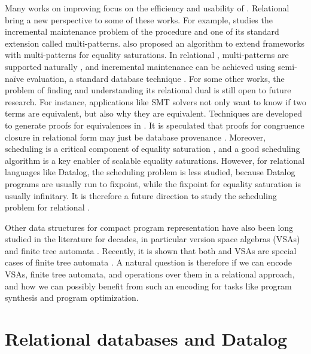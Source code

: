 Many works on improving \egraphs focus on the efficiency and usability of \egraphs.
Relational \egraphs bring a new perspective to some of these works.
For example, \citep{efficient-ematching} studies 
 the incremental maintenance problem of the \ematching procedure
 and one of its standard extension called multi-patterns.
\citet{tensat} also proposed an algorithm 
 to extend \egraph frameworks with multi-patterns for equality saturations.
In relational \egraphs, multi-patterns are supported naturally \citep{relational-ematching},
 and incremental maintenance can be achieved using semi-na\"ive evaluation,
 a standard database technique \citep{datalog-survey}.
For some other works, 
 the problem of finding and understanding its relational dual 
 is still open to future research.
For instance,
 applications like SMT solvers not only want to know if two terms are equivalent, 
 but also why they are equivalent.
Techniques are developed to generate proofs for equivalences in \egraphs \citep{proof-producing}.
It is speculated that proofs for congruence closure in relational form 
 may just be database provenance \citep{prov-semiring,prov-souffle}.
Moreover,
 scheduling is a critical component of equality saturation \citep{egg}, 
 and a good scheduling algorithm is a key enabler of scalable equality saturations.
However, 
 for relational languages like Datalog,
 the scheduling problem is less studied,
 because Datalog programs are usually run to fixpoint,
 while the fixpoint for equality saturation is usually infinitary.
It is therefore a future direction to study the scheduling problem for relational \egraphs.

Other data structures for compact program representation 
 have also been long studied in the literature for decades,
 in particular version space algebras (VSAs) \citep{vsa,flashmeta} 
 and finite tree automata \citep{blaze, dace}.
Recently, it is shown that both \egraphs and VSAs are special cases of finite tree automata \citep{vsa-eq-fta}.
A natural question is therefore if we can encode 
 VSAs, finite tree automata, and operations over them in a relational approach,
 and how we can possibly benefit from such an encoding for tasks 
 like program synthesis and program optimization.

\section{Relational databases and Datalog}

